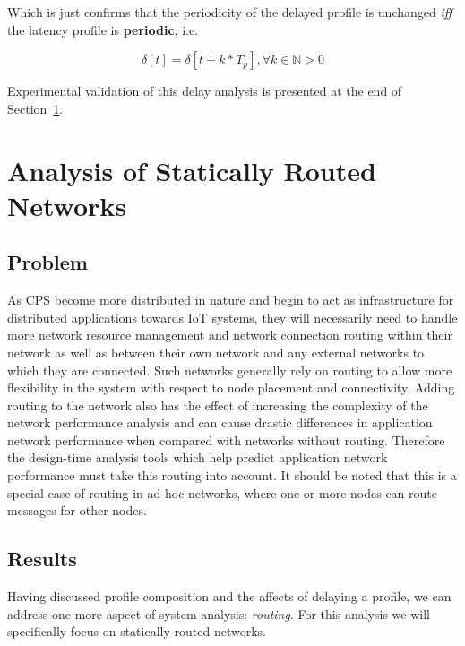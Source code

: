Which is just confirms that the periodicity of the delayed profile is
unchanged \emph{iff} the latency profile is \textbf{periodic}, i.e.

\begin{equation}
\delta[t] = \delta[t + k*T_p], \forall k\in\mathbb{N} > 0
\end{equation}

Experimental validation of this delay analysis is presented at the end
of Section~\ref{sec:routing}.

\newpage

\section{Analysis of Statically Routed Networks}
\label{sec:routing}

\subsection{Problem}
As CPS become more distributed in nature and begin to act as
infrastructure for distributed applications towards IoT systems, they
will necessarily need to handle more network resource management and
network connection routing within their network as well as between
their own network and any external networks to which they are
connected.  Such networks generally rely on routing to allow more
flexibility in the system with respect to node placement and
connectivity.  Adding routing to the network also has the effect of
increasing the complexity of the network performance analysis and can
cause drastic differences in application network performance when
compared with networks without routing.  Therefore the design-time
analysis tools which help predict application network performance must
take this routing into account.  It should be noted that this is a
special case of routing in ad-hoc networks, where one or more nodes
can route messages for other nodes.

\subsection{Results}
Having discussed profile composition and the affects of delaying a
profile, we can address one more aspect of system analysis:
\emph{routing}.  For this analysis we will specifically focus on
statically routed networks.

